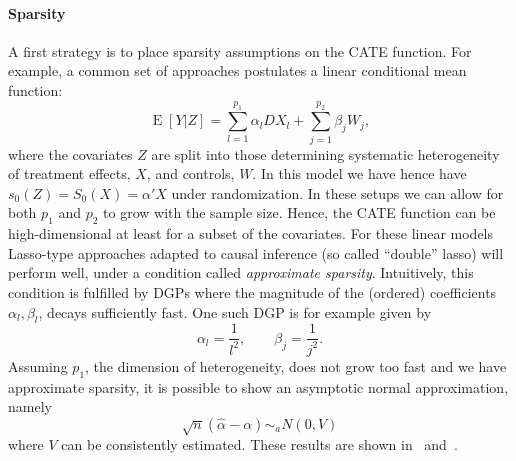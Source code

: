 \documentclass[11pt, a4paper, leqno]{article}
\DeclareMathOperator{\E}{E}
\begin{document}
\paragraph*{Sparsity}
A first strategy is to place sparsity assumptions on the CATE function.
For example, a common set of approaches postulates a linear conditional mean function:
\begin{equation*}
    \E[Y|Z] = \sum_{l=1}^{p_1}\alpha_l DX_l + \sum_{j=1}^{p_2}\beta_j W_j,
\end{equation*}
where the covariates $Z$ are split into those determining systematic heterogeneity of treatment effects, $X$, and controls, $W$.
In this model we have hence have $s_0(Z) = S_0(X) = \alpha'X$ under randomization. In these setups we can allow for both $p_1$ and $p_2$ to grow with the sample size.
Hence, the CATE function can be high-dimensional at least for a subset of the covariates.
For these linear models Lasso-type approaches adapted to causal inference (so called ``double'' lasso) will perform well, under a condition called \textit{approximate sparsity}.
Intuitively, this condition is fulfilled by DGPs where the magnitude of the (ordered) coefficients $\alpha_l, \beta_l$, decays sufficiently fast.
One such DGP is for example given by
\begin{equation*}
    \alpha_l = \frac{1}{l^2}, \qquad \beta_j = \frac{1}{j^2}.
\end{equation*}
Assuming $p_1$, the dimension of heterogeneity, does not grow too fast and we have approximate sparsity, it is possible to show an asymptotic normal approximation, namely
\begin{equation*}
    \sqrt{n}(\hat{\alpha}-\alpha) \sim_a N(0,V)
\end{equation*}
where $V$ can be consistently estimated. These results are shown in~\cite{belloni2015uniform} and~\cite{belloni2018uniformly}.
\end{document}
